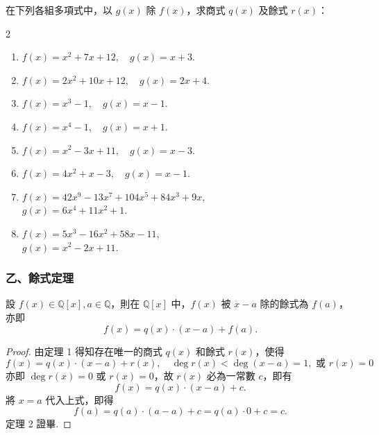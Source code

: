 在下列各組多項式中，以 $g(x)$ 除 $f(x)$，求商式 $q(x)$ 及餘式 $r(x)$：
\begin{multicols}{2}
\begin{enumerate}[1.]
  \item $f(x)=x^2+7x+12, \quad g(x)=x+3$.
  \item $f(x)=2x^2+10x+12, \quad g(x)=2x+4$.
  \item $f(x)=x^3-1, \quad g(x)=x-1$.
  \item $f(x)=x^4-1, \quad g(x)=x+1$.
  \item $f(x)=x^2-3x+11, \quad g(x)=x-3$.
  \item $f(x)=4x^2+x-3, \quad g(x)=x-1$.
  \item $f(x)=42x^9-13x^7+104x^5+84x^3+9x$,\\
  $g(x)=6x^4+11x^2+1$.
  \item $f(x)=5x^3-16x^2+58x-11$,\\
  $g(x)=x^2-2x+11$.
\end{enumerate}
\end{multicols}

\subsubsection*{乙、餘式定理}\label{subsec:5-4-b}

\begin{theorem}[餘式定理]\label{thm:remainder_thm}
設 $f(x) \in \mathbb{Q}[x], a \in \mathbb{Q}$，則在 $\mathbb{Q}[x]$ 中，$f(x)$ 被 $x-a$ 除的餘式為 $f(a)$，亦即
\begin{equation*}
  f(x) = q(x) \cdot (x-a) + f(a).
\end{equation*}
\end{theorem}

\begin{proof}
由定理 1 得知存在唯一的商式 $q(x)$ 和餘式 $r(x)$，使得
\begin{equation*}
  f(x) = q(x) \cdot (x-a) + r(x), \quad \deg r(x) < \deg(x-a) = 1, \text{ 或 } r(x)=0
\end{equation*}
亦即 $\deg r(x)=0$ 或 $r(x)=0$，故 $r(x)$ 必為一常數 $c$，即有
\begin{equation*}
  f(x) = q(x) \cdot (x-a) + c.
\end{equation*}
將 $x=a$ 代入上式，即得
\begin{equation*}
  f(a) = q(a) \cdot (a-a) + c = q(a) \cdot 0 + c = c.
\end{equation*}
定理 2 證畢.
\end{proof}

